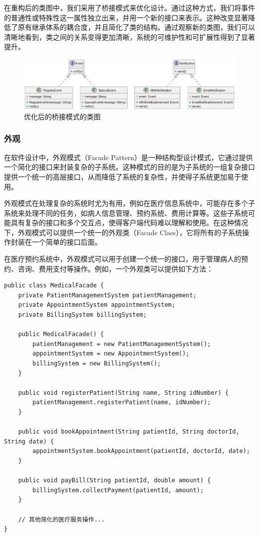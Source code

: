 在重构后的类图中，我们采用了桥接模式来优化设计。通过这种方式，我们将事件的普通性或特殊性这一属性独立出来，并用一个新的接口来表示。这种改变显著降低了原有继承体系的耦合度，并且简化了类的结构。通过观察新的类图，我们可以清晰地看到，类之间的关系变得更加清晰，系统的可维护性和可扩展性得到了显著提升。


\begin{figure}[htbp]
	\centering
	\includegraphics[width=0.6\textheight]{figures/06.png}
	\caption{优化后的桥接模式的类图}
\end{figure}

\subsubsection{外观}

在软件设计中，外观模式（Facade Pattern）是一种结构型设计模式，它通过提供一个简化的接口来封装复杂的子系统。这种模式的目的是为子系统的一组复杂接口提供一个统一的高层接口，从而降低了系统的复杂性，并使得子系统更加易于使用。

外观模式在处理复杂的系统时尤为有用，例如在医疗信息系统中，可能存在多个子系统来处理不同的任务，如病人信息管理、预约系统、费用计算等。这些子系统可能具有复杂的接口和多个交互点，使得客户端代码难以理解和使用。在这种情况下，外观模式可以提供一个统一的外观类（Facade Class），它将所有的子系统操作封装在一个简单的接口后面。

在医疗预约系统中，外观模式可以用于创建一个统一的接口，用于管理病人的预约、咨询、费用支付等操作。例如，一个外观类可以提供如下方法：

\begin{lstlisting}[caption={外观类}]
public class MedicalFacade {
	private PatientManagementSystem patientManagement;
	private AppointmentSystem appointmentSystem;
	private BillingSystem billingSystem;
	
	public MedicalFacade() {
		patientManagement = new PatientManagementSystem();
		appointmentSystem = new AppointmentSystem();
		billingSystem = new BillingSystem();
	}
	
	public void registerPatient(String name, String idNumber) {
		patientManagement.registerPatient(name, idNumber);
	}
	
	public void bookAppointment(String patientId, String doctorId, String date) {
		appointmentSystem.bookAppointment(patientId, doctorId, date);
	}
	
	public void payBill(String patientId, double amount) {
		billingSystem.collectPayment(patientId, amount);
	}
	
	// 其他简化的医疗服务操作...
}
\end{lstlisting}

